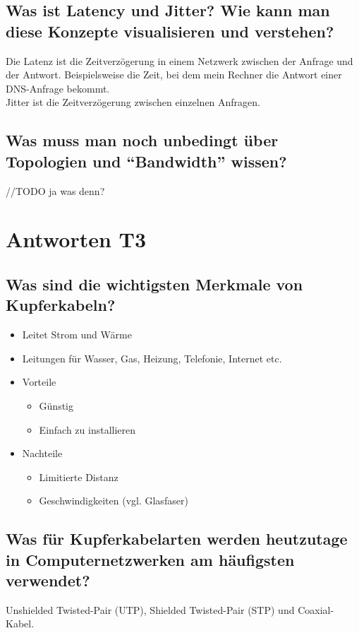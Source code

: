 \subsection*{Was ist \flqq{}Latency\frqq{} und \flqq{}Jitter\frqq? Wie kann man diese Konzepte visualisieren und verstehen?}
Die Latenz ist die Zeitverzögerung in einem Netzwerk zwischen der Anfrage und der Antwort. Beispielsweise die Zeit, bei dem mein Rechner die Antwort einer DNS-Anfrage bekommt.\\
Jitter ist die Zeitverzögerung zwischen einzelnen Anfragen.

\subsection*{Was muss man noch unbedingt über Topologien und "`Bandwidth"' wissen?}
//TODO ja was denn?

\section{Antworten T3}
\subsection*{Was sind die wichtigsten Merkmale von Kupferkabeln?}
\begin{itemize}
    \item Leitet Strom und Wärme
    \item Leitungen für Wasser, Gas, Heizung, Telefonie, Internet etc.
    \item Vorteile
    \begin{itemize}
        \item Günstig
        \item Einfach zu installieren
    \end{itemize}
    \item Nachteile
    \begin{itemize}
        \item Limitierte Distanz
        \item Geschwindigkeiten (vgl. Glasfaser)
    \end{itemize}
\end{itemize}

\subsection*{Was für Kupferkabelarten werden heutzutage in Computernetzwerken am häufigsten verwendet?}
Unshielded Twisted-Pair (UTP), Shielded Twisted-Pair (STP) und Coaxial-Kabel.

